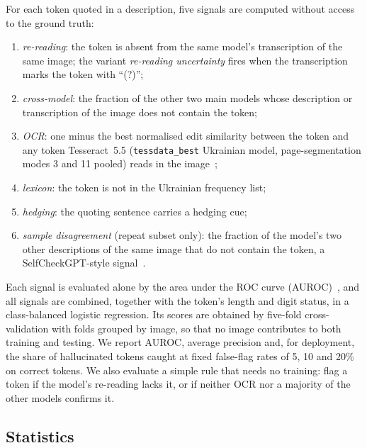 \documentclass[pdflatex,sn-mathphys-num]{sn-jnl}%
\theoremstyle{thmstyleone}%
\theoremstyle{thmstyletwo}%
\theoremstyle{thmstylethree}%
\begin{document}
For each token quoted in a description, five signals are computed without access to the ground truth:
\begin{enumerate}
\item \emph{re-reading}: the token is absent from the same model's transcription of the same image; the variant \emph{re-reading uncertainty} fires when the transcription marks the token with ``(?)'';
\item \emph{cross-model}: the fraction of the other two main models whose description or transcription of the image does not contain the token;
\item \emph{OCR}: one minus the best normalised edit similarity between the token and any token Tesseract~5.5 (\texttt{tessdata\_best} Ukrainian model, page-segmentation modes 3 and 11 pooled) reads in the image~\cite{smith2007overview};
\item \emph{lexicon}: the token is not in the Ukrainian frequency list;
\item \emph{hedging}: the quoting sentence carries a hedging cue;
\item \emph{sample disagreement} (repeat subset only): the fraction of the model's two other descriptions of the same image that do not contain the token, a SelfCheckGPT-style signal~\cite{manakul2023selfcheckgpt}.
\end{enumerate}
Each signal is evaluated alone by the area under the ROC curve (AUROC)~\cite{hanley1982meaning}, and all signals are combined, together with the token's length and digit status, in a class-balanced logistic regression. Its scores are obtained by five-fold cross-validation with folds grouped by image, so that no image contributes to both training and testing. We report AUROC, average precision and, for deployment, the share of hallucinated tokens caught at fixed false-flag rates of 5, 10 and 20\% on correct tokens. We also evaluate a simple rule that needs no training: flag a token if the model's re-reading lacks it, or if neither OCR nor a majority of the other models confirms it.

\subsection{Statistics}\label{sec:stats}
\end{document}
